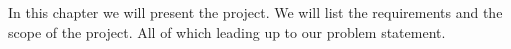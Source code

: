 In this chapter we will present the project. We will list the requirements and the scope of the project. All of which leading up to our problem statement.